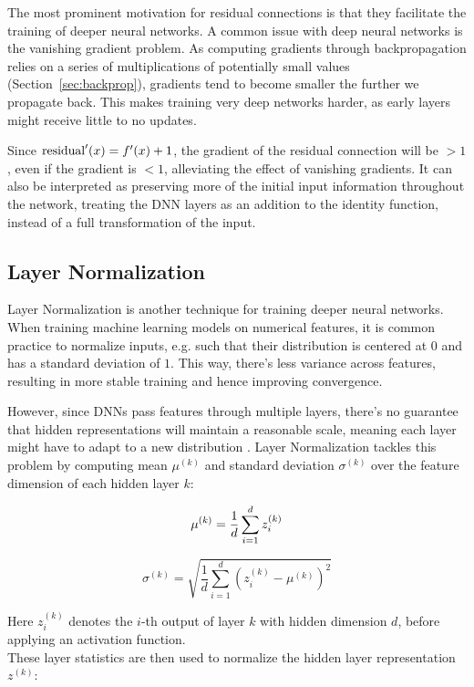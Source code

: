 The most prominent motivation for residual connections is that they facilitate the training of deeper neural networks. A common issue with deep neural networks is the vanishing gradient problem. As computing gradients through backpropagation relies on a series of multiplications of potentially small values (Section~\ref{sec:backprop}), gradients tend to become smaller the further we propagate back. This makes training very deep networks harder, as early layers might receive little to no updates.

Since $\text{residual}'(x) = f'(x) + 1$, the gradient of the residual connection will be $>1$, even if the gradient is $<1$, alleviating the effect of vanishing gradients. It can also be interpreted as preserving more of the initial input information throughout the network, treating the DNN layers as an addition to the identity function, instead of a full transformation of the input.

\subsection{Layer Normalization}
Layer Normalization \cite{ba2016layer} is another technique for training deeper neural networks. When training machine learning models on numerical features, it is common practice to normalize inputs, e.g. such that their distribution is centered at $0$ and has a standard deviation of $1$. This way, there's less variance across features, resulting in more stable training and hence improving convergence.

However, since DNNs pass features through multiple layers, there's no guarantee that hidden representations will maintain a reasonable scale, meaning each layer might have to adapt to a new distribution \cite{DBLP:journals/corr/IoffeS15}. Layer Normalization tackles this problem by computing mean $\mu^{(k)}$ and standard deviation $\sigma^{(k)}$ over the feature dimension of each hidden layer $k$:

\begin{equation}
    \mu^{(k)} = \frac{1}{d} \sum_{i=1}^d z_i^{(k)}
\end{equation}

\begin{equation}
    \sigma^{(k)} = \sqrt{\frac{1}{d} \sum_{i=1}^d (z_i^{(k)} - \mu^{(k)})^2}
\end{equation}

Here $z_i^{(k)}$ denotes the $i$-th output of layer $k$ with hidden dimension $d$, before applying an activation function.\\
These layer statistics are then used to normalize the hidden layer representation $z^{(k)}$:

